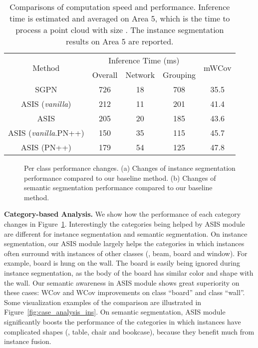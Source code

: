 \documentclass[10pt,twocolumn,letterpaper]{article}
\newcommand{\myparagraph}[1]{{\vspace{0.5em} \noindent \bf #1}}
\begin{document}
\begin{table}[!ht]
\small 
\begin{center}
\setlength{\tabcolsep}{3.8pt}
\begin{tabular}{c|c|cc|c}
\hline
\hline
 \multirow{2}{*}{Method}      &   \multicolumn{3}{c|}{Inference Time (ms)} &  \multirow{2}{*}{mWCov}\\
\cline{2-4}
 & Overall & Network & Grouping & \\
\hline
SGPN       & 726  & 18  & 708  & 35.5   \\
ASIS (\textit{vanilla})  & 212 & 11 & 201 & 41.4 \\
ASIS      & 205 & 20 & 185 & 43.6 \\
\hline
ASIS (\textit{vanilla}.PN++)  &  150 & 35 & 115 & 45.7 \\
ASIS (PN++)  & 179 & 54 & 125 &  47.8 \\

\hline
\end{tabular}
\end{center}
\vspace{-0.3cm}
\caption{Comparisons of computation speed and performance. Inference time is estimated and averaged on Area 5, which is the time to process a point cloud with size . The instance segmentation results on Area 5 are reported. }
\label{tab:s3dis_efficiency}
\vspace{-0.2cm}
\end{table}


\begin{figure}[htbp]
\centering
{}
\vspace{-0.1cm}
\caption{Per class performance changes. (a) Changes of instance segmentation performance compared to our baseline method. (b) Changes of semantic segmentation performance compared to our baseline method.}
\label{fig:percate}
\vspace{-0.2cm}
\end{figure}

\myparagraph{Category-based Analysis.}
We show how the performance of each category changes in Figure~\ref{fig:percate}.
Interestingly the categories being helped by ASIS module are different for instance segmentation and semantic segmentation.
On instance segmentation, our ASIS module largely helps the categories in which  instances often surround with instances of other classes (\eg, beam, board and window). 
For example, board is hung on the wall.
The board is easily being ignored during instance segmentation, as the body of the board has similar color and shape with the wall.
Our semantic awareness in ASIS module shows great superiority on these cases:  WCov and  WCov improvements on class ``board'' and class ``wall''.  
Some visualization examples of the comparison are illustrated in Figure~\ref{fig:case_analysis_ins}.
On semantic segmentation, ASIS module significantly boosts the performance of the categories in which instances have complicated shapes (\eg, table, chair and bookcase), because they benefit much from instance fusion.
\end{document}
